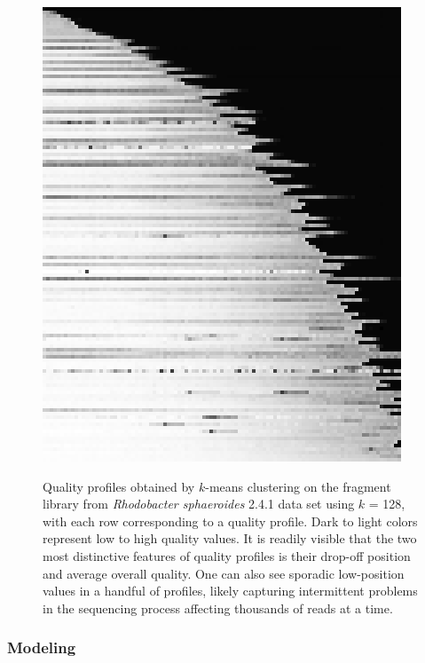 \begin{figure}[!tpb]%
\begin{center}
\includegraphics[width=.8\textwidth]{profiles_128.png}
\end{center}
\renewcommand{\baselinestretch}{1}
\small\normalsize
\begin{quote}
\caption[Quality profiles obtained by $k$-means clustering on the
  fragment library from \textit{Rhodobacter sphaeroides} 2.4.1 data
  set]{Quality profiles obtained by $k$-means clustering on the
  fragment library from \textit{Rhodobacter sphaeroides} 2.4.1 data
  set using $k$ = 128, with each row corresponding to a quality
  profile. Dark to light colors represent low to high quality
  values. It is readily visible that the two most distinctive features
  of quality profiles is their drop-off position and average overall
  quality. One can also see sporadic low-position values in a handful
  of profiles, likely capturing intermittent problems in the
  sequencing process affecting thousands of reads at a
  time.}
  \label{fig:profiles_128}
\end{quote}
\end{figure}
\renewcommand{\baselinestretch}{2}
\small\normalsize

\subsubsection{Modeling}


